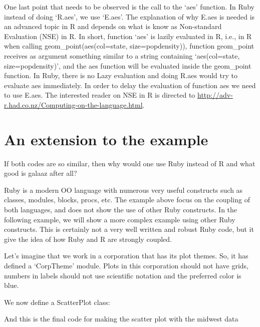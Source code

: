 \documentclass[11pt,]{article}
\begin{document}
One last point that needs to be observed is the call to the `aes'
function. In Ruby instead of doing `R.aes', we use `E.aes'. The
explanation of why E.aes is needed is an advanced topic in R and depends
on what is know as Non-standard Evaluation (NSE) in R. In short,
function `aes' is lazily evaluated in R, i.e., in R when calling
geom\_point(aes(col=state, size=popdensity)), function geom\_point
receives as argument something similar to a string containing
`aes(col=state, size=popdensity)', and the aes function will be
evaluated inside the geom\_point function. In Ruby, there is no Lazy
evaluation and doing R.aes would try to evaluate aes immediately. In
order to delay the evaluation of function aes we need to use E.aes. The
interested reader on NSE in R is directed to
\url{http://adv-r.had.co.nz/Computing-on-the-language.html}.

\hypertarget{an-extension-to-the-example}{%
\section{An extension to the
example}\label{an-extension-to-the-example}}

If both codes are so similar, then why would one use Ruby instead of R
and what good is galaaz after all?

Ruby is a modern OO language with numerous very useful constructs such
as classes, modules, blocks, procs, etc. The example above focus on the
coupling of both languages, and does not show the use of other Ruby
constructs. In the following example, we will show a more complex
example using other Ruby constructs. This is certainly not a very well
written and robust Ruby code, but it give the idea of how Ruby and R are
strongly coupled.

Let's imagine that we work in a corporation that has its plot themes.
So, it has defined a `CorpTheme' module. Plots in this corporation
should not have grids, numbers in labels should not use scientific
notation and the preferred color is blue.

We now define a ScatterPlot class:

And this is the final code for making the scatter plot with the midwest
data
\end{document}
